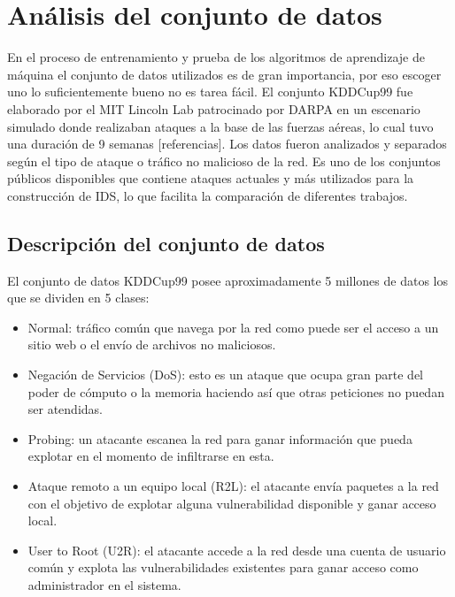 \chapter{Análisis del conjunto de datos}\label{chapter:dataset}

En el proceso de entrenamiento y prueba de los algoritmos de aprendizaje de máquina el conjunto de datos utilizados es de gran importancia, por eso escoger uno lo suficientemente bueno no es tarea fácil. El conjunto KDDCup99 fue elaborado por el MIT Lincoln Lab patrocinado por DARPA en un escenario simulado donde realizaban ataques a la base de las fuerzas aéreas, lo cual tuvo una duración de 9 semanas [referencias]. Los datos fueron analizados y separados según el tipo de ataque o tráfico no malicioso de la red. Es uno de los conjuntos públicos disponibles que contiene ataques actuales y más utilizados para la construcción de IDS, lo que facilita la comparación de diferentes trabajos.

\section{Descripción del conjunto de datos}\label{section:dataset_description}
El conjunto de datos KDDCup99 posee aproximadamente 5 millones de datos los que se dividen en 5 clases:

\begin{itemize}
    \item Normal: tráfico común que navega por la red como puede ser el acceso a un sitio web o el envío de archivos no maliciosos.
    \item Negación de Servicios (DoS): esto es un ataque que ocupa gran parte del poder de cómputo o la memoria haciendo así que otras peticiones no puedan ser atendidas.
    \item Probing: un atacante escanea la red para ganar información que pueda explotar en el momento de infiltrarse en esta.
    \item Ataque remoto a un equipo local (R2L): el atacante envía paquetes a la red con el objetivo de explotar alguna vulnerabilidad disponible y ganar acceso local.
    \item User to Root (U2R): el atacante accede a la red desde una cuenta de usuario común y explota las vulnerabilidades existentes para ganar acceso como administrador en el sistema.
\end{itemize}

